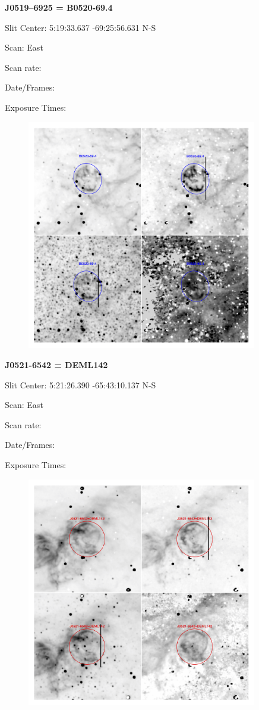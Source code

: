\documentclass[11pt]{article}
\begin{document}
\newpage
{\bf J0519--6925 = B0520-69.4}  
 
Slit Center:   5:19:33.637  -69:25:56.631 N-S

Scan:  East

Scan rate:  

Date/Frames:

Exposure Times:  

\begin{figure}
\includegraphics[width=10.05cm]{snapshots/B0520-694.png}
\end{figure}

\newpage
{\bf J0521-6542 = DEML142}  
 
Slit Center:   5:21:26.390   -65:43:10.137   N-S

Scan:  East

Scan rate:  

Date/Frames:

Exposure Times:  

\begin{figure}
\includegraphics[width=10.05cm]{snapshots/J0521-6542.png}
\end{figure}
\end{document}
